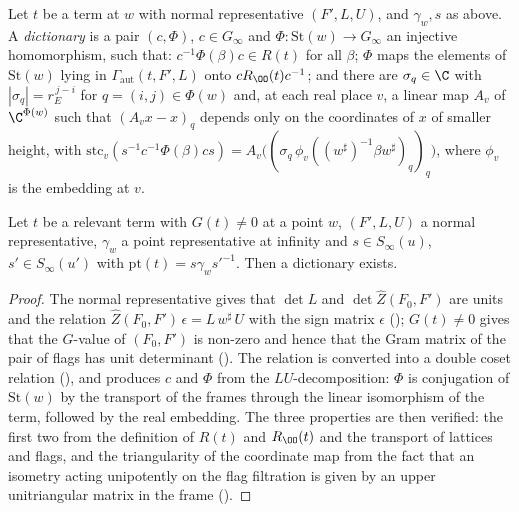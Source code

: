 \begin{definition}[Dictionaries]\label{pf:thmS-leaves:def:dict}
Let $t$ be a term at $w$ with normal representative $(F',L,U)$, and $\gamma_w,s$ as above. A \emph{dictionary} is a pair $(c,\Phi)$, $c\in G_\infty$
and $\Phi:\mathrm{St}(w)\to G_\infty$ an injective homomorphism, such that: $c^{-1}\Phi(\beta)c\in R(t)$ for all $\beta$; $\Phi$ maps the elements of
$\mathrm{St}(w)$ lying in $\Gamma_{\mathrm{aut}}(t,F',L)$ onto $cR_{\OO}(t)c^{-1}$; and there are $\sigma_q\in\C$ with $|\sigma_q|=r_E^{\,j-i}$ for $q=(i,j)\in\Phi(w)$
and, at each real place $v$, a linear map $A_v$ of $\C^{\Phi(w)}$ such that $(A_vx-x)_q$ depends only on the coordinates of $x$ of smaller height,
with $\mathrm{stc}_v(s^{-1}c^{-1}\Phi(\beta)cs)=A_v\bigl((\sigma_q\,\phi_v((w^{\sharp})^{-1}\beta w^\sharp)_q)_q\bigr)$, where $\phi_v$ is the embedding at $v$.
\end{definition}

\begin{proposition}[Dictionary]\label{pf:thmS-leaves:prop:dict}
Let $t$ be a relevant term with $G(t)\ne0$ at a point $w$, $(F',L,U)$ a normal representative, $\gamma_w$ a point representative at infinity and
$s\in S_\infty(u)$, $s'\in S_\infty(u')$ with $\mathrm{pt}(t)=s\gamma_ws'^{-1}$. Then a dictionary exists.
\end{proposition}

\begin{proof}
The normal representative gives that $\det L$ and $\det\widehat Z(F_0,F')$ are units and the relation $\widehat Z(F_0,F')\,\epsilon=L\,w^\sharp\,U$ with the
sign matrix $\epsilon$ (); $G(t)\ne0$ gives that the $G$-value of $(F_0,F')$ is non-zero and hence
that the Gram matrix of the pair of flags has unit determinant (). The
relation is converted into a double coset relation (), and
 produces $c$ and $\Phi$ from the $LU$-decomposition: $\Phi$ is
conjugation of $\mathrm{St}(w)$ by the transport of the frames through the linear isomorphism of the term, followed by the real embedding.
The three properties are then verified: the first two from the definition of $R(t)$ and $R_{\OO}(t)$ and the transport of lattices and flags,
and the triangularity of the coordinate map from the fact that an isometry acting unipotently on the flag filtration is given by an
upper unitriangular matrix in the frame ().
\end{proof}

